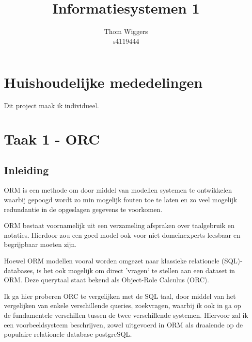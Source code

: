 \documentclass{article}
\author{Thom Wiggers\\ s4119444}
\title{Informatiesystemen 1}
\begin{document}
\maketitle
\tableofcontents
\section{Huishoudelijke mededelingen}
Dit project maak ik individueel. 

\section{Taak 1 - ORC}
\subsection{Inleiding}
\label{sub:1-orm-inleiding}
ORM is een methode om door middel van modellen systemen te ontwikkelen waarbij
gepoogd wordt zo min mogelijk fouten toe te laten en zo veel mogelijk
redundantie in de opgeslagen gegevens te voorkomen. 

ORM bestaat voornamelijk uit een verzameling afspraken over taalgebruik en
notaties. Hierdoor zou een goed model ook voor niet-domeinexperts leesbaar
en begrijpbaar moeten zijn. 

Hoewel ORM modellen vooral worden omgezet naar klassieke relationele
(SQL)-databases, is het ook mogelijk om direct 'vragen` te stellen aan
een dataset in ORM. Deze querytaal staat bekend als Object-Role Calculus 
(ORC).

Ik ga hier proberen ORC te vergelijken met de SQL taal, door middel van het
vergelijken van enkele verschillende queries, zoekvragen, waarbij ik ook 
in ga op de fundamentele verschillen tussen de twee verschillende systemen.
Hiervoor zal ik een voorbeeldsysteem beschrijven, zowel uitgevoerd in ORM 
als draaiende op de populaire relationele database postgreSQL.
\end{document}
